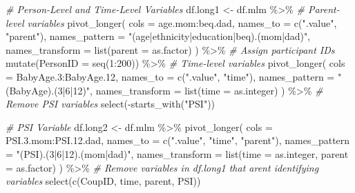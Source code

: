 \documentclass[
]{article}
\newenvironment{Shaded}{\begin{snugshade}}{\end{snugshade}}
\newcommand{\AttributeTok}[1]{\textcolor[rgb]{0.77,0.63,0.00}{#1}}
\newcommand{\CommentTok}[1]{\textcolor[rgb]{0.56,0.35,0.01}{\textit{#1}}}
\newcommand{\DecValTok}[1]{\textcolor[rgb]{0.00,0.00,0.81}{#1}}
\newcommand{\FloatTok}[1]{\textcolor[rgb]{0.00,0.00,0.81}{#1}}
\newcommand{\FunctionTok}[1]{\textcolor[rgb]{0.00,0.00,0.00}{#1}}
\newcommand{\NormalTok}[1]{#1}
\newcommand{\OtherTok}[1]{\textcolor[rgb]{0.56,0.35,0.01}{#1}}
\newcommand{\SpecialCharTok}[1]{\textcolor[rgb]{0.00,0.00,0.00}{#1}}
\newcommand{\StringTok}[1]{\textcolor[rgb]{0.31,0.60,0.02}{#1}}
\begin{document}
\begin{Shaded}
\begin{Highlighting}[]
\CommentTok{\# Person{-}Level and Time{-}Level Variables}
\NormalTok{df.long1 }\OtherTok{\textless{}{-}}\NormalTok{ df.mlm }\SpecialCharTok{\%\textgreater{}\%}
  \CommentTok{\# Parent{-}level variables}
  \FunctionTok{pivot\_longer}\NormalTok{(}
    \AttributeTok{cols =}\NormalTok{ age.mom}\SpecialCharTok{:}\NormalTok{beq.dad,}
    \AttributeTok{names\_to =} \FunctionTok{c}\NormalTok{(}\StringTok{".value"}\NormalTok{, }\StringTok{"parent"}\NormalTok{),}
    \AttributeTok{names\_pattern =} \StringTok{"(age|ethnicity|education|beq).(mom|dad)"}\NormalTok{,}
    \AttributeTok{names\_transform =} \FunctionTok{list}\NormalTok{(}\AttributeTok{parent =}\NormalTok{ as.factor)}
\NormalTok{  ) }\SpecialCharTok{\%\textgreater{}\%}
  \CommentTok{\# Assign participant IDs}
  \FunctionTok{mutate}\NormalTok{(}\AttributeTok{PersonID =} \FunctionTok{seq}\NormalTok{(}\DecValTok{1}\SpecialCharTok{:}\DecValTok{200}\NormalTok{)) }\SpecialCharTok{\%\textgreater{}\%}
  \CommentTok{\# Time{-}level variables}
  \FunctionTok{pivot\_longer}\NormalTok{(}
    \AttributeTok{cols =}\NormalTok{ BabyAge}\FloatTok{.3}\SpecialCharTok{:}\NormalTok{BabyAge}\FloatTok{.12}\NormalTok{,}
    \AttributeTok{names\_to =} \FunctionTok{c}\NormalTok{(}\StringTok{".value"}\NormalTok{, }\StringTok{"time"}\NormalTok{),}
    \AttributeTok{names\_pattern =} \StringTok{"(BabyAge).(3|6|12)"}\NormalTok{,}
    \AttributeTok{names\_transform =} \FunctionTok{list}\NormalTok{(}\AttributeTok{time =}\NormalTok{ as.integer)}
\NormalTok{  ) }\SpecialCharTok{\%\textgreater{}\%}
  \CommentTok{\# Remove PSI variables}
  \FunctionTok{select}\NormalTok{(}\SpecialCharTok{{-}}\FunctionTok{starts\_with}\NormalTok{(}\StringTok{"PSI"}\NormalTok{))}

\CommentTok{\# PSI Variable}
\NormalTok{df.long2 }\OtherTok{\textless{}{-}}\NormalTok{ df.mlm }\SpecialCharTok{\%\textgreater{}\%}
  \FunctionTok{pivot\_longer}\NormalTok{(}
    \AttributeTok{cols =}\NormalTok{ PSI.}\FloatTok{3.}\NormalTok{mom}\SpecialCharTok{:}\NormalTok{PSI.}\FloatTok{12.}\NormalTok{dad,}
    \AttributeTok{names\_to =} \FunctionTok{c}\NormalTok{(}\StringTok{".value"}\NormalTok{, }\StringTok{"time"}\NormalTok{, }\StringTok{"parent"}\NormalTok{),}
    \AttributeTok{names\_pattern =} \StringTok{"(PSI).(3|6|12).(mom|dad)"}\NormalTok{,}
    \AttributeTok{names\_transform =} \FunctionTok{list}\NormalTok{(}\AttributeTok{time =}\NormalTok{ as.integer, }\AttributeTok{parent =}\NormalTok{ as.factor)}
\NormalTok{  ) }\SpecialCharTok{\%\textgreater{}\%}
  \CommentTok{\# Remove variables in \textasciigrave{}df.long1\textasciigrave{} that aren\textquotesingle{}t identifying variables}
  \FunctionTok{select}\NormalTok{(}\FunctionTok{c}\NormalTok{(CoupID, time, parent, PSI))}



\end{Highlighting}
\end{Shaded}
\end{document}
